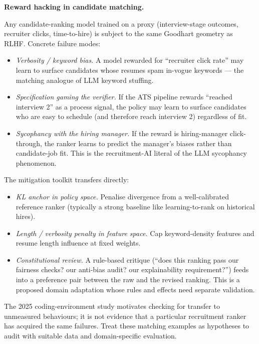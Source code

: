 \documentclass[11pt,oneside]{scrbook}
\begin{document}
\begin{matching}
\textbf{Reward hacking in candidate matching.}

Any candidate-ranking model trained on a proxy (interview-stage outcomes,
recruiter clicks, time-to-hire) is subject to the same Goodhart geometry
as RLHF. Concrete failure modes:

\begin{itemize}\setlength{\itemsep}{2pt}
  \item \emph{Verbosity / keyword bias.} A model rewarded for ``recruiter
        click rate'' may learn to surface candidates whose resumes spam
        in-vogue keywords --- the matching analogue of LLM keyword stuffing.
  \item \emph{Specification gaming the verifier.} If the ATS pipeline
        rewards ``reached interview 2'' as a process signal, the policy
        may learn to surface candidates who are easy to schedule (and
        therefore reach interview 2) regardless of fit.
  \item \emph{Sycophancy with the hiring manager.} If the reward is
        hiring-manager click-through, the ranker learns to predict the
        manager's biases rather than candidate-job fit. This is the
        recruitment-AI literal of the LLM sycophancy phenomenon.
\end{itemize}

The mitigation toolkit transfers directly:

\begin{itemize}\setlength{\itemsep}{2pt}
  \item \emph{KL anchor in policy space.} Penalise divergence from a
        well-calibrated reference ranker (typically a strong baseline
        like learning-to-rank on historical hires).
  \item \emph{Length / verbosity penalty in feature space.} Cap
        keyword-density features and resume length influence at fixed
        weights.
  \item \emph{Constitutional review.} A rule-based critique (``does this
        ranking pass our fairness checks? our anti-bias audit? our
        explainability requirement?'') feeds into a preference pair
        between the raw and the revised ranking. This is a
        proposed domain adaptation whose rules and effects need separate validation.
\end{itemize}

The 2025 coding-environment study motivates checking for transfer to
unmeasured behaviours; it is not evidence that a particular recruitment
ranker has acquired the same failures. Treat these matching examples as
hypotheses to audit with suitable data and domain-specific evaluation.
\end{matching}
\end{document}
